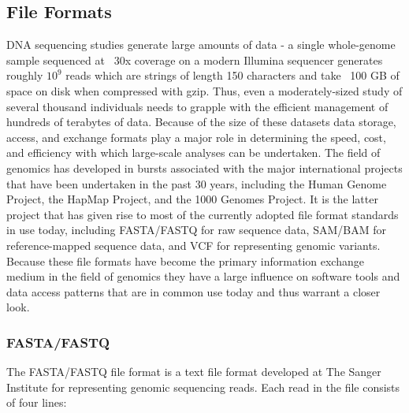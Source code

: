 \subsection{File Formats}
\label{sec:bg_file_formats}

DNA sequencing studies generate large amounts of data - a single whole-genome sample sequenced at ~30x coverage on a modern Illumina sequencer generates roughly $10^9$ reads which are strings of length 150 characters and take ~100 GB of space on disk when compressed with gzip. Thus, even a moderately-sized study of several thousand individuals needs to grapple with the efficient management of hundreds of terabytes of data. Because of the size of these datasets data storage, access, and exchange formats play a major role in determining the speed, cost, and efficiency with which large-scale analyses can be undertaken. The field of genomics has developed in bursts associated with the major international projects that have been undertaken in the past 30 years, including the Human Genome Project\autocite{lander2001initial}, the HapMap Project\autocite{international2003international}, and the 1000 Genomes Project\autocite{10002010map}. It is the latter project that has given rise to most of the currently adopted file format standards in use today, including FASTA/FASTQ for raw sequence data, SAM/BAM for reference-mapped sequence data, and VCF for representing genomic variants. Because these file formats have become the primary information exchange medium in the field of genomics they have a large influence on software tools and data access patterns that are in common use today and thus warrant a closer look.

\subsubsection{FASTA/FASTQ}

The FASTA/FASTQ file format is a text file format developed at The Sanger Institute for representing genomic sequencing reads\autocite{cock2009sanger}. Each read in the file consists of four lines:

